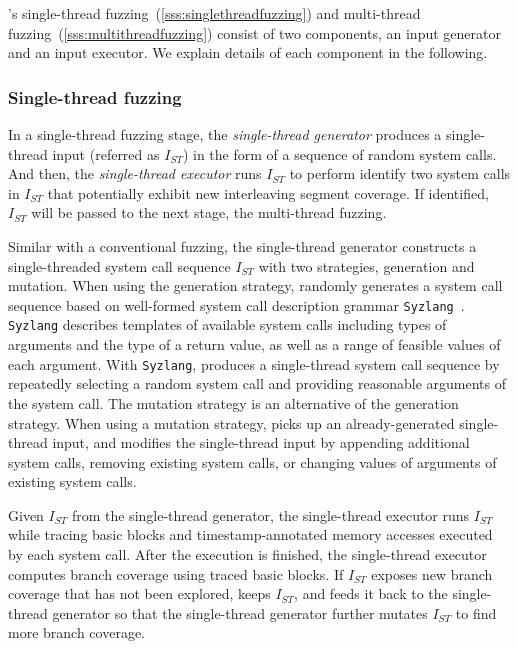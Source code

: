 \sys's single-thread fuzzing~(\autoref{sss:singlethreadfuzzing}) and
multi-thread fuzzing~(\autoref{sss:multithreadfuzzing}) consist of two
components, an input generator and an input executor. We explain
details of each component in the following.


\subsubsection{Single-thread fuzzing}
\label{sss:singlethreadfuzzing}
%
In a single-thread fuzzing stage, the \textit{single-thread generator}
produces a single-thread input (referred as $I_{ST}$) in the form of a
sequence of random system calls.
%
And then, the \textit{single-thread executor} runs $I_{ST}$ to perform
identify two system calls in $I_{ST}$ that potentially exhibit new
interleaving segment coverage.  If identified, $I_{ST}$ will be passed
to the next stage, the multi-thread fuzzing.


%
Similar with a conventional fuzzing, the single-thread generator
constructs a single-threaded system call sequence $I_{ST}$ with two
strategies, generation and mutation.
%
When using the generation strategy, \sys randomly generates a system
call sequence based on well-formed system call description grammar
\texttt{Syzlang}~\cite{syzlang}.
%
\texttt{Syzlang} describes templates of available system calls
including types of arguments and the type of a return value, as well
as a range of feasible values of each argument.
%
With \texttt{Syzlang}, \sys produces a single-thread system call
sequence by repeatedly selecting a random system call and providing
reasonable arguments of the system call.
%
The mutation strategy is an alternative of the generation strategy.
When using a mutation strategy, \sys picks up an already-generated
single-thread input, and modifies the single-thread input by appending
additional system calls, removing existing system calls, or changing
values of arguments of existing system calls.


%
Given $I_{ST}$ from the single-thread generator, the single-thread
executor runs $I_{ST}$ while tracing basic blocks and
timestamp-annotated memory accesses executed by each system call.
%
After the execution is finished, the single-thread executor computes
branch coverage using traced basic blocks.
%
If $I_{ST}$ exposes new branch coverage that has not been explored,
\sys keeps $I_{ST}$, and feeds it back to the single-thread generator
so that the single-thread generator further mutates $I_{ST}$ to find
more branch coverage.


